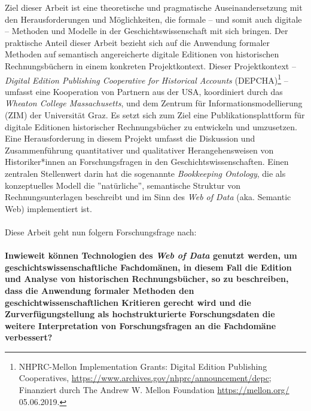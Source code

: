 \documentclass[12pt,a4paper]{article}
\begin{document}
Ziel dieser Arbeit ist eine theoretische und pragmatische Auseinandersetzung mit den Herausforderungen und Möglichkeiten, die formale -- und somit auch digitale -- Methoden und Modelle in der Geschichtswissenschaft mit sich bringen. Der praktische Anteil dieser Arbeit bezieht sich auf die Anwendung formaler Methoden auf semantisch angereicherte digitale Editionen von historischen Rechnungsbüchern in einem konkreten Projektkontext. Dieser Projektkontext -- \textit{Digital Edition Publishing Cooperative for Historical Accounts} (DEPCHA)\footnote{NHPRC-Mellon Implementation Grants: Digital Edition Publishing Cooperatives, \url{https://www.archives.gov/nhprc/announcement/depc}; Finanziert durch The Andrew W. Mellon Foundation \url{ https://mellon.org/} 05.06.2019.} -- umfasst eine Kooperation von Partnern aus der USA, koordiniert durch das \textit{Wheaton College Massachusetts}, und dem Zentrum für Informationsmodellierung (ZIM) der Universität Graz. Es setzt sich zum Ziel eine Publikationsplattform für digitale Editionen historischer Rechnungsbücher zu entwickeln und umzusetzen. Eine Herausforderung in diesem Projekt umfasst die Diskussion und Zusammenführung quantitativer und qualitativer Herangehensweisen von Historiker*innen an Forschungsfragen in den Geschichtswissenschaften. Einen zentralen Stellenwert darin hat die sogenannte \textit{Bookkeeping Ontology}, die als konzeptuelles Modell die ''natürliche'', semantische Struktur von Rechnungsunterlagen beschreibt und im Sinn des \textit{Web of Data} (aka. Semantic Web) implementiert ist.
\\
\\
Diese Arbeit geht nun folgern Forschungsfrage nach:
\\
\\
\textbf{Inwieweit können Technologien des \textit{Web of Data} genutzt werden, um geschichtswissenschaftliche Fachdomänen, in diesem Fall die Edition und Analyse von historischen Rechnungsbücher, so zu beschreiben, dass die Anwendung formaler Methoden den geschichtwissenschaftlichen Kritieren gerecht wird und die Zurverfügungstellung als hochstrukturierte Forschungsdaten die weitere Interpretation von Forschungsfragen an die Fachdomäne verbessert?} 
\end{document}
